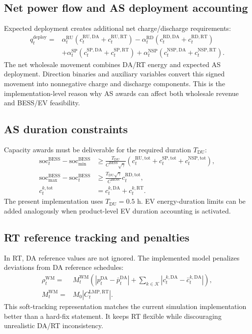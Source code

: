 \documentclass[final,5p,times]{elsarticle}
\newcommand{\BESS}{\mathrm{BESS}}
\newcommand{\DA}{\mathrm{DA}}
\newcommand{\RT}{\mathrm{RT}}
\newcommand{\soc}{\mathrm{soc}}
\newcommand{\RU}{\mathrm{RU}}
\newcommand{\RD}{\mathrm{RD}}
\newcommand{\SP}{\mathrm{SP}}
\newcommand{\NSP}{\mathrm{NSP}}
\newcommand{\WM}{\mathrm{WM}}
\newcommand{\tot}{\mathrm{tot}}
\newcommand{\deploy}{\mathrm{deploy}}
\newcommand{\calK}{\mathcal{K}}
\begin{document}
\subsection{Net power flow and AS deployment accounting}
Expected deployment creates additional net charge/discharge requirements:
\begin{align}
q_t^{\deploy}=&\alpha_t^{\RU}(c_t^{\RU,\DA}+c_t^{\RU,\RT})-
\alpha_t^{\RD}(c_t^{\RD,\DA}+c_t^{\RD,\RT})\nonumber\\
&+\alpha_t^{\SP}(c_t^{\SP,\DA}+c_t^{\SP,\RT})+
\alpha_t^{\NSP}(c_t^{\NSP,\DA}+c_t^{\NSP,\RT}).\label{eq:app_deploy}
\end{align}
The net wholesale movement combines DA/RT energy and expected AS deployment. Direction binaries and auxiliary variables convert this signed movement into nonnegative charge and discharge components. This is the implementation-level reason why AS awards can affect both wholesale revenue and BESS/EV feasibility.

\subsection{AS duration constraints}
Capacity awards must be deliverable for the required duration $T_{\mathrm{DU}}$:
\begin{align}
\soc_t^{\BESS}-\soc_{\min}^{\BESS}
&\ge \frac{T_{\mathrm{DU}}}{C^{\BESS}\sqrt{\gamma}}
\left(c_t^{\RU,\tot}+c_t^{\SP,\tot}+c_t^{\NSP,\tot}\right),\label{eq:app_duration_up}\\
\soc_{\max}^{\BESS}-\soc_t^{\BESS}
&\ge \frac{T_{\mathrm{DU}}\sqrt{\gamma}}{C^{\BESS}}c_t^{\RD,\tot},\label{eq:app_duration_down}\\
c_t^{k,\tot}&=c_t^{k,\DA}+c_t^{k,\RT}.\label{eq:app_capacity_total}
\end{align}
The present implementation uses $T_{\mathrm{DU}}=0.5$ h. EV energy-duration limits can be added analogously when product-level EV duration accounting is activated.

\subsection{RT reference tracking and penalties}
In RT, DA reference values are not ignored. The implemented model penalizes deviations from DA reference schedules:
\begin{align}
\rho_t^{\WM}=&M_t^{\WM}\left(|p_t^{\DA}-\bar p_t^{\DA}|+
\sum_{k\in\calK}|c_t^{k,\DA}-\bar c_t^{k,\DA}|\right),\label{eq:app_rt_penalty}\\
M_t^{\WM}=&M_0|C_t^{\mathrm{LMP},\RT}|.\label{eq:app_rt_weight}
\end{align}
This soft-tracking representation matches the current simulation implementation better than a hard-fix statement. It keeps RT flexible while discouraging unrealistic DA/RT inconsistency.
\end{document}
